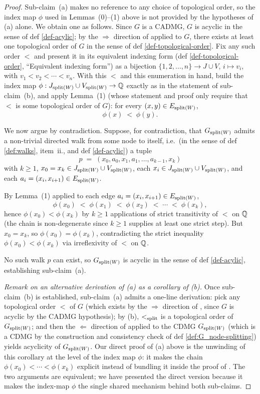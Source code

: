 \documentclass[main]{subfiles}
\begin{document}
\begin{proof}
Sub-claim~(a) makes no reference to any choice of topological order, so the index map $\phi$ used in Lemmas~(0)--(1) above is not provided by the hypotheses of (a) alone. We obtain one as follows. Since $G$ is a CADMG, $G$ is acyclic in the sense of def \ref{def-acylic}; by the $\Rightarrow$ direction of  applied to $G$, there exists at least one topological order of $G$ in the sense of def \ref{def-topological-order}. Fix any such order $<$ and present it in its equivalent indexing form (def \ref{def-topological-order}, ``Equivalent indexing form'') as a bijection $\{1, 2, \dots, n\} \to J \cup V$, $i \mapsto v_i$, with $v_1 < v_2 < \cdots < v_n$. With this $<$ and this enumeration in hand, build the index map $\phi : J_{\mathrm{split}(W)} \cup V_{\mathrm{split}(W)} \to \mathbb{Q}$ exactly as in the statement of sub-claim~(b), and apply Lemma~(1) (whose statement and proof only require that $<$ is some topological order of $G$): for every $(x, y) \in E_{\mathrm{split}(W)}$,
\[
    \phi(x) \;<\; \phi(y).
\]

We now argue by contradiction. Suppose, for contradiction, that $G_{\mathrm{split}(W)}$ admits a non-trivial directed walk from some node to itself, i.e.\ (in the sense of def \ref{def:walks}, item~ii., and def \ref{def-acylic}) a tuple
\[
    p \;=\; (x_0, a_0, x_1, a_1, \dots, a_{k-1}, x_k)
\]
with $k \ge 1$, $x_0 = x_k \in J_{\mathrm{split}(W)} \cup V_{\mathrm{split}(W)}$, each $x_i \in J_{\mathrm{split}(W)} \cup V_{\mathrm{split}(W)}$, and each $a_i = (x_i, x_{i+1}) \in E_{\mathrm{split}(W)}$.

By Lemma~(1) applied to each edge $a_i = (x_i, x_{i+1}) \in E_{\mathrm{split}(W)}$,
\[
    \phi(x_0) \;<\; \phi(x_1) \;<\; \phi(x_2) \;<\; \cdots \;<\; \phi(x_k),
\]
hence $\phi(x_0) < \phi(x_k)$ by $k \ge 1$ applications of strict transitivity of $<$ on $\mathbb{Q}$ (the chain is non-degenerate since $k \ge 1$ supplies at least one strict step). But $x_0 = x_k$, so $\phi(x_0) = \phi(x_k)$, contradicting the strict inequality $\phi(x_0) < \phi(x_k)$ via irreflexivity of $<$ on $\mathbb{Q}$.

No such walk $p$ can exist, so $G_{\mathrm{split}(W)}$ is acyclic in the sense of def \ref{def-acylic}, establishing sub-claim~(a).

\medskip\noindent\emph{Remark on an alternative derivation of (a) as a corollary of (b).}
Once sub-claim~(b) is established, sub-claim~(a) admits a one-line derivation: pick any topological order $<$ of $G$ (which exists by the $\Rightarrow$ direction of , since $G$ is acyclic by the CADMG hypothesis); by (b), $<_{\mathrm{split}}$ is a topological order of $G_{\mathrm{split}(W)}$; and then the $\Leftarrow$ direction of  applied to the CDMG $G_{\mathrm{split}(W)}$ (which is a CDMG by the construction and consistency check of def \ref{def:G_node-splitting}) yields acyclicity of $G_{\mathrm{split}(W)}$. Our direct proof of (a) above is the unwinding of this corollary at the level of the index map $\phi$: it makes the chain $\phi(x_0) < \cdots < \phi(x_k)$ explicit instead of bundling it inside the proof of . The two arguments are equivalent; we have presented the direct version because it makes the index-map $\phi$ the single shared mechanism behind both sub-claims.


\end{proof}
\end{document}
